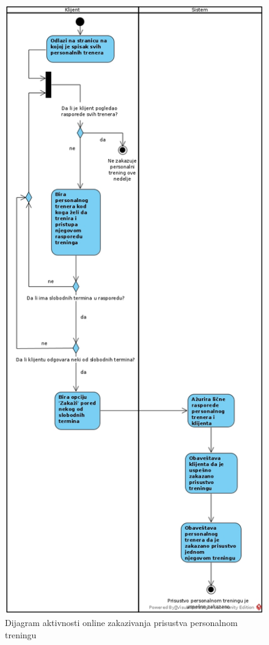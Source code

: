 \newpage
\begin{figure}[!ht]
\begin{center}
\includegraphics[scale=0.38]{sections/images/dijagram-aktivnosti-personalni-online-zakazivanje-prisustva.jpg}
\end{center}
\caption{Dijagram aktivnosti online zakazivanja prisustva personalnom treningu}
\label{fig:kontekst}
\end{figure}




